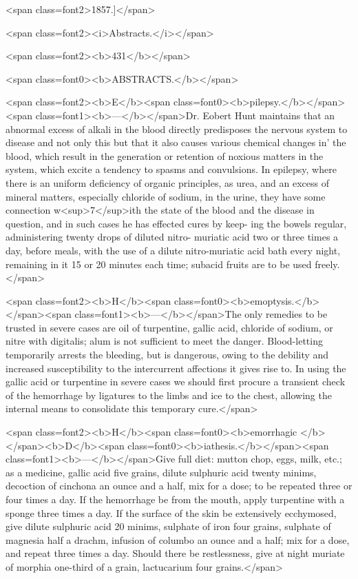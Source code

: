 <span class=font2>1857.]</span>

<span class=font2><i>Abstracts.</i></span>

<span class=font2><b>431</b></span>

<span class=font0><b>ABSTRACTS.</b></span>

<span class=font2><b>E</b><span class=font0><b>pilepsy.</b></span><span class=font1><b>---</b></span>Dr. Eobert Hunt maintains that an abnormal excess of
alkali in the blood directly predisposes the nervous system to disease
and not only this but that it also causes various chemical changes in'
the blood, which result in the generation or retention of noxious matters
in the system, which excite a tendency to spasms and convulsions. In
epilepsy, where there is an uniform deficiency of organic principles, as
urea, and an excess of mineral matters, especially chloride of sodium,
in the urine, they have some connection w<sup>7</sup>ith the state of the blood and
the disease in question, and in such cases he has effected cures by keep-
ing the bowels regular, administering twenty drops of diluted nitro-
muriatic acid two or three times a day, before meals, with the use of a
dilute nitro-muriatic acid bath every night, remaining in it 15 or 20
minutes each time; subacid fruits are to be used freely.</span>

<span class=font2><b>H</b><span class=font0><b>emoptysis.</b></span><span class=font1><b>---</b></span>The only remedies to be trusted in severe cases are oil
of turpentine, gallic acid, chloride of sodium, or nitre with digitalis;
alum is not sufficient to meet the danger. Blood-letting temporarily
arrests the bleeding, but is dangerous, owing to the debility and increased
susceptibility to the intercurrent affections it gives rise to. In using the
gallic acid or turpentine in severe cases we should first procure a transient
check of the hemorrhage by ligatures to the limbs and ice to the chest,
allowing the internal means to consolidate this temporary cure.</span>

<span class=font2><b>H</b><span class=font0><b>emorrhagic </b></span><b>D</b><span class=font0><b>iathesis.</b></span><span class=font1><b>---</b></span>Give full diet: mutton chop, eggs, milk,
etc.; as a medicine, gallic acid five grains, dilute sulphuric acid twenty
minims, decoction of cinchona an ounce and a half, mix for a dose; to
be repeated three or four times a day. If the hemorrhage be from the
mouth, apply turpentine with a sponge three times a day. If the surface
of the skin be extensively ecchymosed, give dilute sulphuric acid 20
minims, sulphate of iron four grains, sulphate of magnesia half a drachm,
infusion of columbo an ounce and a half; mix for a dose, and repeat
three times a day. Should there be restlessness, give at night muriate
of morphia one-third of a grain, lactucarium four grains.</span>

